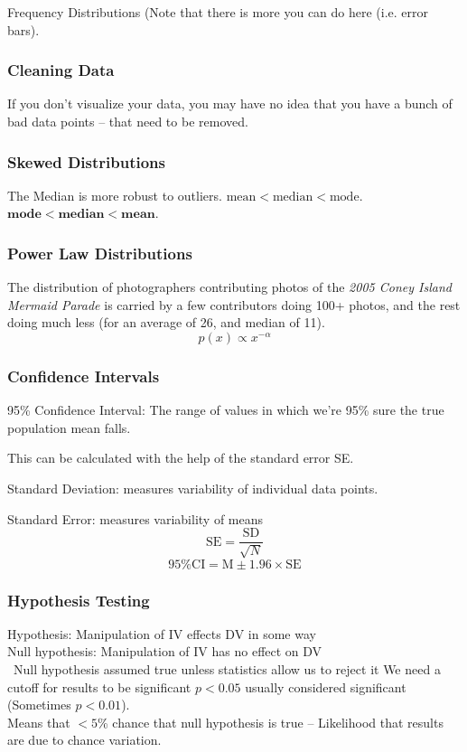 Frequency Distributions (Note that there is more you can do here (i.e. error bars).

\subsubsection{Cleaning Data}
If you don't visualize your data, you may have no idea that you have a bunch of bad data points -- that need to be removed.

\subsubsection{Skewed Distributions}
The Median is more robust to outliers.
$\text{mean} < \text{median} < \text{mode}.$
$\textbf{mode} < \textbf{median} < \textbf{mean}$.

\subsubsection{Power Law Distributions}
The distribution of photographers contributing photos of the \textit{2005 Coney Island Mermaid Parade} is carried by a few contributors doing 100+ photos, and the rest doing much less (for an average of 26, and median of 11).
\[p(x) \propto x^{-\alpha}\]

\subsubsection{Confidence Intervals}
95\% Confidence Interval: The range of values in which we’re 95\% sure the true population mean falls.

This can be calculated with the help of the standard error SE.

Standard Deviation: measures variability of individual data points.

Standard Error: measures variability of means
\[\text{SE}=\frac{\text{SD}}{\sqrt{N}}\]
\[
95 \% \text{CI} = \text{M} \pm 1.96 \times \text{SE}
\]

\subsubsection{Hypothesis Testing}
Hypothesis: Manipulation of IV effects DV in some way\\
Null hypothesis: Manipulation of IV has no effect on DV\\\
Null hypothesis assumed true unless statistics allow us to reject it
\myparagraph{p-values}
We need a cutoff for results to be significant 
$p < 0.05$ usually considered significant (Sometimes $p < 0.01$).\\
Means that $< 5$\% chance that null hypothesis is true -- Likelihood that results are due to chance variation.

